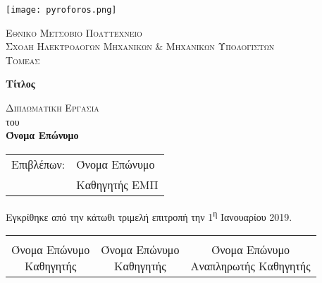 	\begin{center}
	
	\vspace*{-1cm}

    \texttt{[image: pyroforos.png]}
        
    \Large
    \textsc{Εθνικο Μετσοβιο Πολυτεχνειο}\\
    \large
    \textsc{Σχολη Ηλεκτρολογων Μηχανικων \& Μηχανικων Υπολογιστων}\\
    \textsc{Τομεας}
    
    \vspace{1.5cm}
	
	\Huge
    \textbf{Τίτλος}
        
    \vspace{1.5cm}
    \Large
    \textsc{Διπλωματικη Εργασια}\\
    του\\

    \LARGE
    \textbf{Όνομα Επώνυμο}
    
    \vfill
    \end{center}
    
    \begin{tabular}{ll}
		Επιβλέπων: & Όνομα Επώνυμο \\
		 & Καθηγητής ΕΜΠ
	\end{tabular}
	
	\vspace{1.5cm}
    
    Εγκρίθηκε από την κάτωθι τριμελή επιτροπή την 1\textsuperscript{η} Ιανουαρίου 2019.
    
    \vspace{1.5cm}
	
	\begin{center}
	\noindent\begin{tabular}{ccc}
		\makebox[0.3\textwidth]{\hrulefill} & 
		\makebox[0.3\textwidth]{\hrulefill} & 
		\makebox[0.3\textwidth]{\hrulefill} \\

		\specialcell{Όνομα Επώνυμο \\ Καθηγητής} & 
		\specialcell{Όνομα Επώνυμο \\ Καθηγητής} & 
		\specialcell{Όνομα Επώνυμο \\ Αναπληρωτής Καθηγητής} \\ [8ex]%
	\end{tabular}
	\end{center}